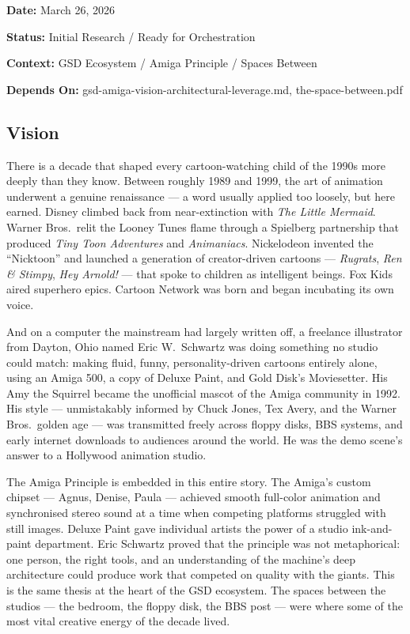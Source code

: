 \documentclass[11pt,letterpaper]{article}
\newcommand{\metafield}[2]{\textbf{\sffamily #1} #2\par}
\begin{document}
\metafield{Date:}{March 26, 2026}
\metafield{Status:}{Initial Research / Ready for Orchestration}
\metafield{Context:}{GSD Ecosystem / Amiga Principle / Spaces Between}
\metafield{Depends On:}{gsd-amiga-vision-architectural-leverage.md, the-space-between.pdf}

\subsection{Vision}

There is a decade that shaped every cartoon-watching child of the 1990s more deeply than they know. Between roughly 1989 and 1999, the art of animation underwent a genuine renaissance --- a word usually applied too loosely, but here earned. Disney climbed back from near-extinction with \textit{The Little Mermaid}. Warner Bros.\ relit the Looney Tunes flame through a Spielberg partnership that produced \textit{Tiny Toon Adventures} and \textit{Animaniacs}. Nickelodeon invented the ``Nicktoon'' and launched a generation of creator-driven cartoons --- \textit{Rugrats}, \textit{Ren \& Stimpy}, \textit{Hey Arnold!} --- that spoke to children as intelligent beings. Fox Kids aired superhero epics. Cartoon Network was born and began incubating its own voice.

And on a computer the mainstream had largely written off, a freelance illustrator from Dayton, Ohio named Eric W.\ Schwartz was doing something no studio could match: making fluid, funny, personality-driven cartoons entirely alone, using an Amiga 500, a copy of Deluxe Paint, and Gold Disk's Moviesetter. His Amy the Squirrel became the unofficial mascot of the Amiga community in 1992. His style --- unmistakably informed by Chuck Jones, Tex Avery, and the Warner Bros.\ golden age --- was transmitted freely across floppy disks, BBS systems, and early internet downloads to audiences around the world. He was the demo scene's answer to a Hollywood animation studio.

The Amiga Principle is embedded in this entire story. The Amiga's custom chipset --- Agnus, Denise, Paula --- achieved smooth full-color animation and synchronised stereo sound at a time when competing platforms struggled with still images. Deluxe Paint gave individual artists the power of a studio ink-and-paint department. Eric Schwartz proved that the principle was not metaphorical: one person, the right tools, and an understanding of the machine's deep architecture could produce work that competed on quality with the giants. This is the same thesis at the heart of the GSD ecosystem. The spaces between the studios --- the bedroom, the floppy disk, the BBS post --- were where some of the most vital creative energy of the decade lived.
\end{document}
